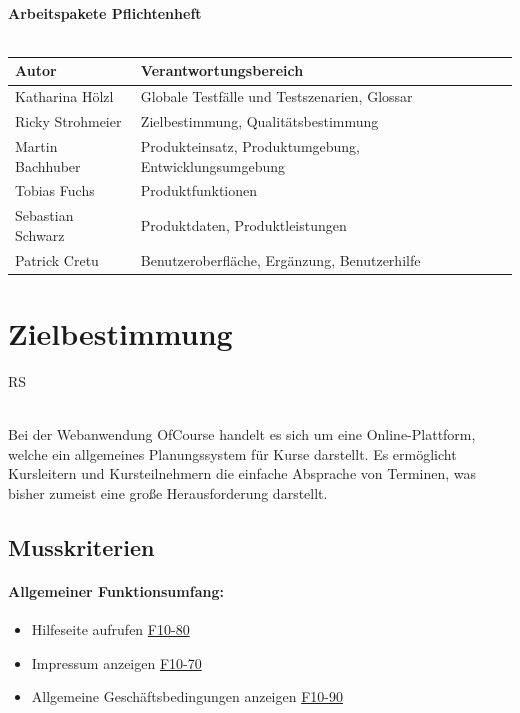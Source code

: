 \documentclass[a4paper]{scrreprt}
\begin{document}
\begin{titlepage}
\begin{center}
        \ \\
        \ \\
        \hspace{3 cm}\\
          \textbf{Arbeitspakete Pflichtenheft} \\
          \ \\
        
        \begin{tabular}{ | l | l |}
        	\hline
        	\textbf{Autor} & \textbf{Verantwortungsbereich} \\ \hline
        	 Katharina Hölzl & Globale Testfälle und Testszenarien, Glossar  \\ \hline
        	 Ricky Strohmeier& Zielbestimmung, Qualitätsbestimmung  \\ \hline
        	 Martin Bachhuber & Produkteinsatz, Produktumgebung, Entwicklungsumgebung  \\ \hline
	         Tobias Fuchs & Produktfunktionen \\ \hline
        	 Sebastian Schwarz & Produktdaten, Produktleistungen \\ \hline  
	         Patrick Cretu  &  Benutzeroberfläche, Ergänzung, Benutzerhilfe  \\ \hline
        \end{tabular}
    \end{center}
\end{titlepage}
 
 


\tableofcontents
 
\chapter{Zielbestimmung}
	\begin{tiny}
		RS
	\end{tiny}\\
	   Bei der Webanwendung OfCourse handelt es sich um eine Online-Plattform, welche ein allgemeines Planungssystem für Kurse darstellt. Es ermöglicht Kursleitern und Kursteilnehmern die einfache Absprache von Terminen, was bisher zumeist eine große Herausforderung darstellt.
    \section{Musskriterien}      
    	\subsubsection{Allgemeiner Funktionsumfang:}
      		\begin{itemize}
	      		\item Hilfeseite aufrufen \hyperlink{hilfeSeite}{F10-80}
	      		\item Impressum anzeigen \hyperlink{impressum}{F10-70}
	      		\item Allgemeine Geschäftsbedingungen anzeigen \hyperlink{agb}{F10-90}
      		\end{itemize}
\end{document}
